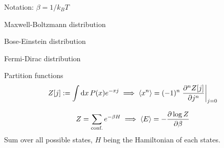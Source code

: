 \documentclass[main]{subfiles}
\begin{document}
Notation: $\beta = 1/k_BT$

\begin{multicols}{2}

Maxwell-Boltzmann distribution

Bose-Einstein distribution

Fermi-Dirac distribution

Partition functions
\begin{gather}
    Z[j] := \int\dd{x} P(x) e^{-xj} \implies \langle x^n \rangle = (-1)^n \eval{\pdv[n]{Z[j]}{j}}_{j=0}
\end{gather}

\begin{gather}
    Z = \sum_{\text{conf.}} e^{-\beta H} \implies \langle E \rangle = -\pdv{\log Z}{\beta}
\end{gather}
Sum over all possible states, $H$ being the Hamiltonian of each states.

\end{multicols}
\end{document}
